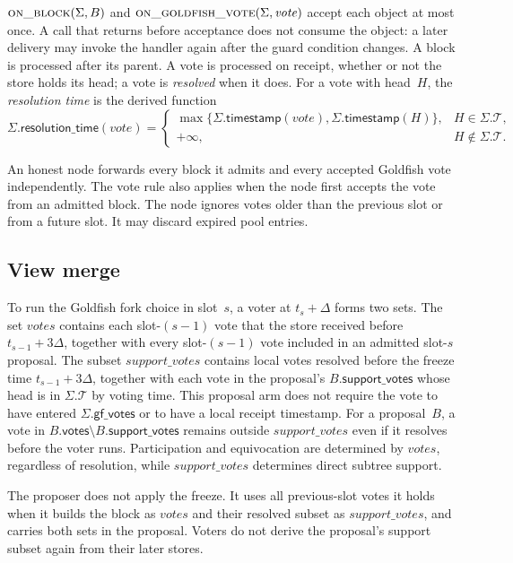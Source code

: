 \documentclass{article}
\theoremstyle{plain}
\theoremstyle{definition}
\theoremstyle{remark}
\newcommand{\T}{\mathcal T}
\newcommand{\gfPool}{\mathsf{gf\_votes}}
\newcommand{\timestamp}{\mathsf{timestamp}}
\newcommand{\resolutionTime}{\mathsf{resolution\_time}}
\begin{document}
$\Call{on\_block}{\Sigma,B}$ and
$\Call{on\_goldfish\_vote}{\Sigma,\mathit{vote}}$
accept each object at most once.  A call that returns before acceptance does
not consume the object: a later delivery may invoke the handler again after
the guard condition changes.  A block is processed after its parent.  A vote is
processed on receipt, whether or not the store holds its head; a vote is
\emph{resolved} when it does.  For a vote with head~$H$, the
\emph{resolution time} is the derived function
\[
 \Sigma.\resolutionTime(\mathit{vote})=
 \begin{cases}
  \max\{\Sigma.\timestamp(\mathit{vote}),\Sigma.\timestamp(H)\},
    & H\in\Sigma.\T,\\
  +\infty, & H\notin\Sigma.\T.
 \end{cases}
\]

An honest node forwards every block it admits and every accepted Goldfish
vote independently.  The vote rule also applies when the node first accepts
the vote from an admitted block.  The node ignores votes older than the
previous slot or from a future slot.  It may discard
expired pool entries.

\subsection{View merge}\label{sec:view-merge}

To run the Goldfish fork choice in slot~$s$, a voter at $t_s+\Delta$ forms
two sets.  The set $\mathit{votes}$ contains each slot-$(s-1)$ vote that the
store received before $t_{s-1}+3\Delta$, together with every slot-$(s-1)$
vote included in an admitted slot-$s$ proposal.  The subset
$\mathit{support\_votes}$ contains local votes resolved before the freeze time
$t_{s-1}+3\Delta$, together with each vote in the proposal's
$B.\mathsf{support\_votes}$ whose head is in $\Sigma.\T$ by voting time.  This
proposal arm does not require the vote to have entered $\Sigma.\gfPool$ or to
have a local receipt timestamp.  For a proposal~$B$, a vote in
$B.\mathsf{votes}\setminus B.\mathsf{support\_votes}$ remains
outside $\mathit{support\_votes}$ even if it resolves before the voter runs.  Participation
and equivocation are determined by $\mathit{votes}$, regardless of resolution,
while $\mathit{support\_votes}$ determines direct subtree support.

The proposer does not apply the freeze.  It uses all previous-slot votes it
holds when it builds the block as $\mathit{votes}$ and their resolved subset as
$\mathit{support\_votes}$, and carries both sets in the proposal.  Voters do
not derive the proposal's support subset again from their later stores.
\end{document}
